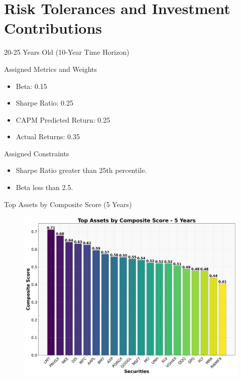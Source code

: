 \documentclass{beamer}
\begin{document}
\section{Risk Tolerances and Investment Contributions}
\begin{frame}{20-25 Years Old (10-Year Time Horizon)}
    \begin{block}{Assigned Metrics and Weights}
        \begin{itemize}
            \item Beta: 0.15
            \item Sharpe Ratio: 0.25
            \item CAPM Predicted Return: 0.25
            \item Actual Returns: 0.35
        \end{itemize}
    \end{block}
    \begin{block}{Assigned Constraints}
        \begin{itemize}
            \item Sharpe Ratio greater than 25th percentile.
            \item Beta less than 2.5.
        \end{itemize}
    \end{block}
\end{frame}




\begin{frame}{Top Assets by Composite Score (5 Years)}
    \begin{figure}
        \centering
        \includegraphics[width=0.9\linewidth]{top_assets_composite_score_5_years.png}
    \end{figure}
\end{frame}
\end{document}
